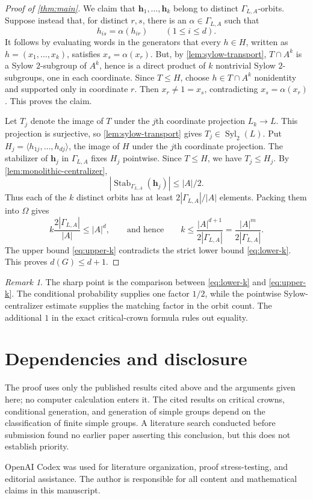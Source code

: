 \documentclass[11pt,reqno]{amsart}
\theoremstyle{remark}
\newtheorem{remark}[theorem]{Remark}
\DeclareMathOperator{\Syl}{Syl}
\DeclareMathOperator{\Stab}{Stab}
\newcommand{\gen}[1]{\langle #1\rangle}
\newcommand{\GammaLA}{\Gamma_{L,A}}
\begin{document}
\begin{proof}[Proof of \cref{thm:main}]
We claim that $\mathbf h_1,\ldots,\mathbf h_k$ belong to distinct
$\GammaLA$-orbits.  Suppose instead that, for distinct $r,s$, there is an
$\alpha\in\GammaLA$ such that
\[
 h_{is}=\alpha(h_{ir})\qquad(1\leq i\leq d).
\]
It follows by evaluating words in the generators that every $h\in H$, written
as $h=(x_1,\ldots,x_k)$, satisfies $x_s=\alpha(x_r)$.  But, by
\cref{lem:sylow-transport}, $T\cap A^k$ is a Sylow $2$-subgroup of $A^k$,
hence is a direct product of $k$ nontrivial Sylow $2$-subgroups, one in each
coordinate.  Since $T\leq H$, choose $h\in T\cap A^k$ nonidentity and
supported only in coordinate $r$.  Then
$x_r\neq1=x_s$, contradicting $x_s=\alpha(x_r)$.  This proves the claim.

Let $T_j$ denote the image of $T$ under the $j$th coordinate projection
$L_k\to L$.  This projection is surjective, so
\cref{lem:sylow-transport} gives $T_j\in\Syl_2(L)$.  Put
$H_j=\gen{h_{1j},\ldots,h_{dj}}$, the image of $H$ under the $j$th coordinate
projection.  The stabilizer of $\mathbf h_j$ in $\GammaLA$ fixes $H_j$
pointwise.  Since $T\leq H$, we have $T_j\leq H_j$.  By
\cref{lem:monolithic-centralizer},
\[
 |\Stab_{\GammaLA}(\mathbf h_j)|\leq |A|/2.
\]
Thus each of the $k$ distinct orbits has at least
$2|\GammaLA|/|A|$ elements.  Packing them into $\Omega$ gives
\begin{equation}\label{eq:upper-k}
 k\frac{2|\GammaLA|}{|A|}\leq |A|^d,
 \qquad\text{and hence}\qquad
 k\leq \frac{|A|^{d+1}}{2|\GammaLA|}
   =\frac{|A|^m}{2|\GammaLA|}.
\end{equation}
The upper bound \eqref{eq:upper-k} contradicts the strict lower bound
\eqref{eq:lower-k}.  This proves $d(G)\leq d+1$.
\end{proof}

\begin{remark}
The sharp point is the comparison between \eqref{eq:lower-k} and
\eqref{eq:upper-k}.  The conditional probability supplies one factor
$1/2$, while the pointwise Sylow-centralizer estimate supplies the matching
factor in the orbit count.  The additional $1$ in the exact critical-crown
formula rules out equality.
\end{remark}

\section*{Dependencies and disclosure}

The proof uses only the published results cited above and the arguments given
here; no computer calculation enters it.  The cited results on critical
crowns, conditional generation, and generation of simple groups depend on
the classification of finite simple groups.  A literature search conducted
before submission found no earlier paper asserting this conclusion, but this
does not establish priority.

OpenAI Codex was used for literature organization, proof stress-testing, and
editorial assistance.  The author is responsible for all content and
mathematical claims in this manuscript.



\end{document}
